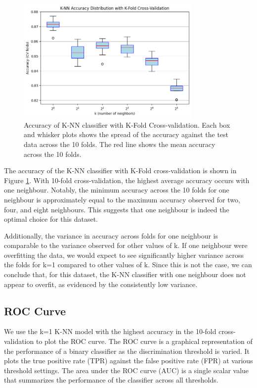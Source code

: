 \documentclass[12pt]{article}
\begin{document}
\begin{figure}[H]
\centering
\includegraphics[width=0.8\textwidth]{figures/knn_accuracy_kfold.png}
\caption{Accuracy of K-NN classifier with K-Fold Cross-validation. Each box and whisker plots shows the spread of the accuracy against the test data across the 10 folds. The red line shows the mean accuracy across the 10 folds.}
\label{fig:knn_accuracy_kfold}
\end{figure}

The accuracy of the K-NN classifier with K-Fold cross-validation is shown in Figure \ref{fig:knn_accuracy_kfold}. With 10-fold cross-validation, the highest average accuracy occurs with one neighbour. Notably, the minimum accuracy across the 10 folds for one neighbour is approximately equal to the maximum accuracy observed for two, four, and eight neighbours. This suggests that one neighbour is indeed the optimal choice for this dataset.

Additionally, the variance in accuracy across folds for one neighbour is comparable to the variance observed for other values of k. If one neighbour were overfitting the data, we would expect to see significantly higher variance across the folds for k=1 compared to other values of k. Since this is not the case, we can conclude that, for this dataset, the K-NN classifier with one neighbour does not appear to overfit, as evidenced by the consistently low variance.
\\

\subsection{ROC Curve}
\noindent
We use the k=1 K-NN model with the highest accuracy in the 10-fold cross-validation to plot the ROC curve. The ROC curve is a graphical representation of the performance of a binary classifier as the discrimination threshold is varied. It plots the true positive rate (TPR) against the false positive rate (FPR) at various threshold settings. The area under the ROC curve (AUC) is a single scalar value that summarizes the performance of the classifier across all thresholds.
\end{document}
